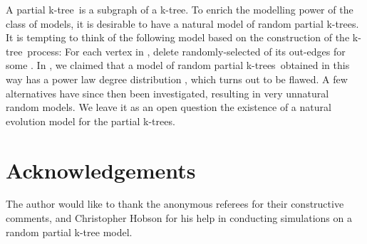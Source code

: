 \documentclass[11pt]{article}
\providecommand{\ktree}{k-tree}
\providecommand{\ktrees}{k-trees}
\begin{document}
A partial \ktree\ is a subgraph of a \ktree. To enrich the modelling power of the class of models, it is desirable to have a natural model of
random partial \ktrees.  It is tempting to think of the following model based on the construction of the \ktree\ process:  For each vertex  in
, delete randomly-selected  of its  out-edges for some 
. In \cite{gao06waw}, we claimed that a model of random partial \ktrees\ obtained in this way has
a power law degree distribution , which turns out to be flawed. A few alternatives have since then been
investigated, resulting in very unnatural random models. We leave it as an open question the existence of a natural evolution model for the partial \ktrees.



















































\section*{Acknowledgements} 
The author would like to thank the anonymous referees for their constructive comments, and 
Christopher Hobson for his help in conducting simulations on a random partial k-tree model.


\end{document}
